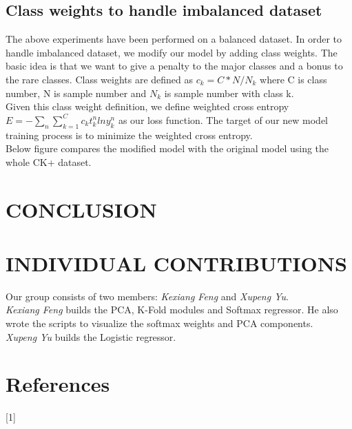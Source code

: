 \documentclass{article} %
\begin{document}
\subsection {Class weights to handle imbalanced dataset}
The above experiments have been performed on a balanced dataset. In order to handle imbalanced dataset, we modify our model by adding class weights. The basic idea is that we want to give a penalty to the major classes and a bonus to the rare classes. Class weights are defined as $c_k = C*N/N_k$ where C is class number, N is sample number and $N_k$ is sample number with class k. \\
Given this class weight definition, we define weighted cross entropy $E = -\sum_{n}\sum_{k=1}^{C} c_k t_k^n ln y_k^n $ as our loss function. The target of our new model training process is to minimize the weighted cross entropy. \\
Below figure compares the modified model with the original model using the whole CK+ dataset.

\section {CONCLUSION}
\section{INDIVIDUAL CONTRIBUTIONS}
Our group consists of two members: \textit{Kexiang Feng} and \textit{Xupeng Yu}. \\
\textit{Kexiang Feng} builds the PCA, K-Fold modules and Softmax regressor. He also wrote the scripts to visualize the softmax weights and PCA components. \\
\textit{Xupeng Yu} builds the Logistic regressor. 

\section {References}
\small{
[1]
}
\end{document}
